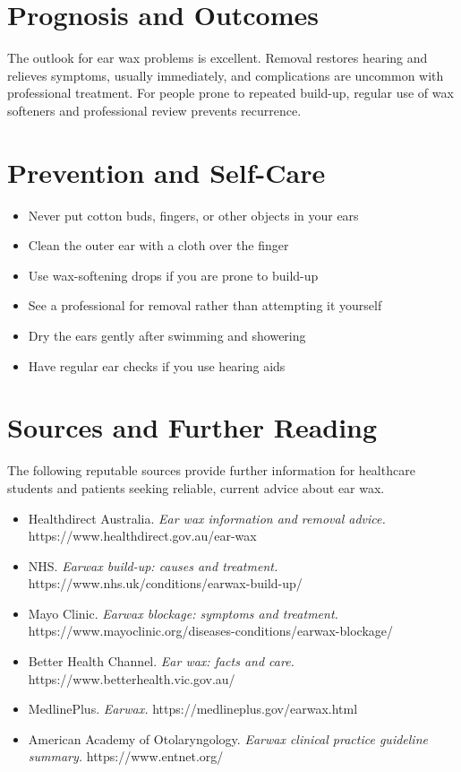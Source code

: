 \section*{Prognosis and Outcomes}
The outlook for ear wax problems is excellent. Removal restores hearing and relieves symptoms, usually immediately, and complications are uncommon with professional treatment. For people prone to repeated build-up, regular use of wax softeners and professional review prevents recurrence.

\section*{Prevention and Self-Care}
\begin{itemize}
    \item Never put cotton buds, fingers, or other objects in your ears
    \item Clean the outer ear with a cloth over the finger
    \item Use wax-softening drops if you are prone to build-up
    \item See a professional for removal rather than attempting it yourself
    \item Dry the ears gently after swimming and showering
    \item Have regular ear checks if you use hearing aids
\end{itemize}

\section*{Sources and Further Reading}
The following reputable sources provide further information for healthcare students and patients seeking reliable, current advice about ear wax.
\begin{itemize}
    \item Healthdirect Australia. \textit{Ear wax information and removal advice.} https://www.healthdirect.gov.au/ear-wax
    \item NHS. \textit{Earwax build-up: causes and treatment.} https://www.nhs.uk/conditions/earwax-build-up/
    \item Mayo Clinic. \textit{Earwax blockage: symptoms and treatment.} https://www.mayoclinic.org/diseases-conditions/earwax-blockage/
    \item Better Health Channel. \textit{Ear wax: facts and care.} https://www.betterhealth.vic.gov.au/
    \item MedlinePlus. \textit{Earwax.} https://medlineplus.gov/earwax.html
    \item American Academy of Otolaryngology. \textit{Earwax clinical practice guideline summary.} https://www.entnet.org/
\end{itemize}
